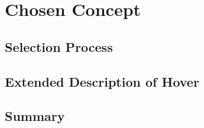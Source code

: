 \documentclass[../Main.tex]{subfiles}
\begin{document}
\section{Chosen Concept}
\subsection{Selection Process}
\subsection{Extended Description of Hover}
\subsection{Summary}

\biblio %
\end{document}
